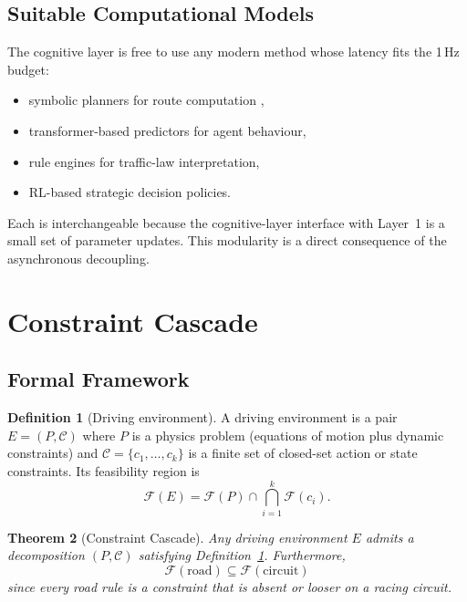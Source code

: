 \documentclass[11pt,twocolumn]{article}
\newtheorem{theorem}{Theorem}
\theoremstyle{definition}
\newtheorem{definition}[theorem]{Definition}
\theoremstyle{remark}
\newcommand{\Feas}{\mathcal{F}}
\providecommand{\cC}{\mathcal{C}}
\begin{document}
\subsection{Suitable Computational Models}

The cognitive layer is free to use any modern method whose latency fits the 1\,Hz budget:
\begin{itemize}[leftmargin=*,itemsep=2pt]
\item symbolic planners for route computation \cite{russell2020artificial},
\item transformer-based predictors for agent behaviour,
\item rule engines for traffic-law interpretation,
\item RL-based strategic decision policies.
\end{itemize}

Each is interchangeable because the cognitive-layer interface with Layer~1 is a small set of parameter updates. This modularity is a direct consequence of the asynchronous decoupling.

\section{Constraint Cascade}
\label{sec:constraint-cascade}

\subsection{Formal Framework}

\begin{definition}[Driving environment]\label{def:env}
A driving environment is a pair $E = (P, \cC)$ where $P$ is a physics problem (equations of motion plus dynamic constraints) and $\cC = \{c_1, \ldots, c_k\}$ is a finite set of closed-set action or state constraints. Its feasibility region is
\begin{equation}
\Feas(E) = \Feas(P) \cap \bigcap_{i=1}^{k} \Feas(c_i).
\end{equation}
\end{definition}

\begin{theorem}[Constraint Cascade]\label{thm:cascade}
Any driving environment $E$ admits a decomposition $(P, \cC)$ satisfying Definition~\ref{def:env}. Furthermore,
\begin{equation}
\Feas(\mathrm{road}) \subseteq \Feas(\mathrm{circuit})
\end{equation}
since every road rule is a constraint that is absent or looser on a racing circuit.
\end{theorem}
\end{document}
